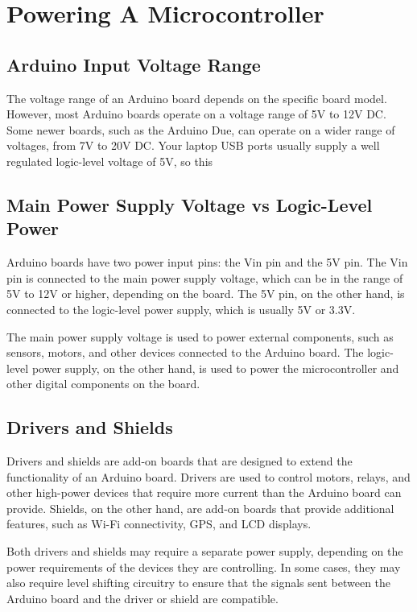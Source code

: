 \documentclass[a4paper,12pt]{report}
\begin{document}
\newpage

\section*{Powering A Microcontroller} {

    \subsection*{Arduino Input Voltage Range}
        The voltage range of an Arduino board depends on the specific board model. 
        However, most Arduino boards operate on a voltage range of 5V to 12V DC. 
        Some newer boards, such as the Arduino Due, can operate on a wider range of voltages, from 7V to 20V DC.
        Your laptop USB ports usually supply a well regulated logic-level voltage of 5V, so this 

    \subsection*{Main Power Supply Voltage vs Logic-Level Power}
        Arduino boards have two power input pins: the Vin pin and the 5V pin. 
        The Vin pin is connected to the main power supply voltage, which can be in the range of 
        5V to 12V or higher, depending on the board. The 5V pin, on the other hand, is connected 
        to the logic-level power supply, which is usually 5V or 3.3V.

        The main power supply voltage is used to power external components, such as sensors, 
        motors, and other devices connected to the Arduino board. 
        The logic-level power supply, on the other hand, is used to power the 
        microcontroller and other digital components on the board.

    \subsection*{Drivers and Shields}
        Drivers and shields are add-on boards that are designed to extend the functionality of an 
        Arduino board. Drivers are used to control motors, relays, and other high-power devices that 
        require more current than the Arduino board can provide. Shields, on the other hand, are add-on 
        boards that provide additional features, such as Wi-Fi connectivity, GPS, and LCD displays.
        
        Both drivers and shields may require a separate power supply, depending on the power requirements 
        of the devices they are controlling. In some cases, they may also require level shifting circuitry 
        to ensure that the signals sent between the Arduino board and the driver or shield are compatible. \\
        
}
\end{document}
